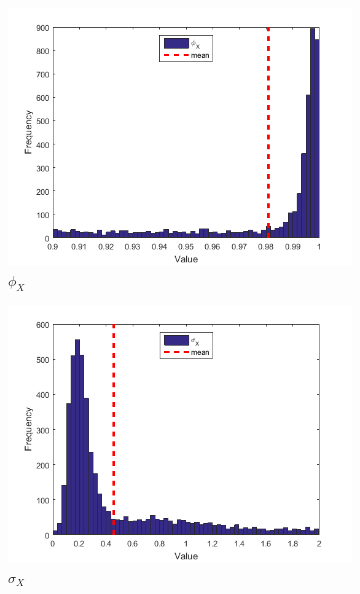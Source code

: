 \documentclass[11pt,a4,twosided,singlespacing,titlepagenumber=on]{scrreprt}
\numberwithin{equation}{chapter} %
\theoremstyle{remark}
\begin{document}
\begin{figure}[H]
    \centering
    \begin{subfigure}[t]{0.32\textwidth}
        \centering
        \includegraphics[width=1\textwidth]{res/params/2192_2923/1}
        \caption{$\phi_X$}
    \end{subfigure}
    \begin{subfigure}[t]{0.32\textwidth}
        \centering
        \includegraphics[width=1\textwidth]{res/params/2192_2923/2}
        \caption{$\sigma_X$}
    \end{subfigure}
    \begin{subfigure}[t]{0.32\textwidth}
        \centering

\end{subfigure}
\end{figure}
\end{document}
